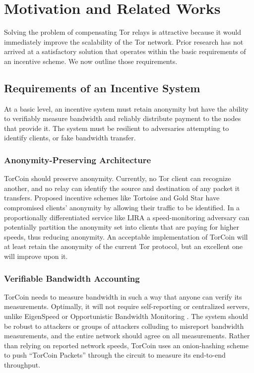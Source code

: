 \section{Motivation and Related Works} \label{motivation} Solving the problem of
compensating Tor relays is attractive because it would immediately improve the
scalability of the Tor network. Prior research has not arrived at a satisfactory
solution that operates within the basic requirements of an incentive scheme. We
now outline those requirements.

\subsection{Requirements of an Incentive System} At a basic level, an incentive
system must retain anonymity but have the ability to verifiably measure
bandwidth and reliably distribute payment to the nodes that provide it. The
system must be resilient to adversaries attempting to  identify clients, or fake
bandwidth transfer.

\subsubsection{Anonymity-Preserving Architecture} TorCoin should preserve
anonymity. Currently, no Tor client can recognize another, and no relay can
identify the source and destination of any packet it transfers. Proposed
incentive schemes like Tortoise\cite{acsac11-tortoise} and Gold Star\cite
{incentives-fc10} have compromised clients' anonymity by allowing their traffic
to be identified\cite{jansen2013lira}. In a proportionally differentiated
service \cite{blake1998architecture, dovrolis1999case} like LIRA
\cite{jansen2013lira} a speed-monitoring adversary can potentially partition the
anonymity set into clients that are paying for higher speeds, thus reducing
anonymity. An acceptable implementation of TorCoin will at least retain the
anonymity of the current Tor protocol, but an excellent one will improve upon
it.

\subsubsection{Verifiable Bandwidth Accounting} TorCoin needs to measure
bandwidth in such a way that anyone can verify its measurements. Optimally, it
will not require self-reporting or centralized servers, unlike EigenSpeed
\cite{snader2009eigenspeed} or Opportunistic Bandwidth Monitoring
\cite{snader2008tune}. The system should be robust to attackers or groups of
attackers colluding to misreport bandwidth measurements, and the entire network 
should agree on all measurements. Rather than relying on reported network
speeds, TorCoin uses an onion-hashing scheme to push ``TorCoin Packets'' through
the circuit to measure its end-to-end throughput.

